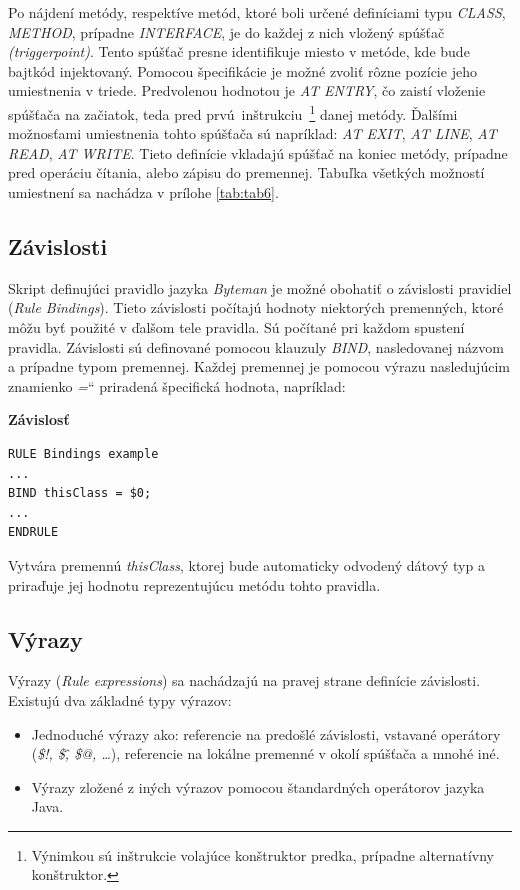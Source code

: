 \documentclass[11pt,final,oneside]{fithesis}
\newcommand\qt[1]{\quotedblbase #1\textquotedblleft}%
\newenvironment{example}[1]
{
\vspace{3mm}
\noindent\textbf{#1}
\vspace{2mm}
}
{
\vspace{3mm}
}
\begin{document}
Po nájdení metódy, respektíve metód, ktoré boli určené definíciami typu
\textit{CLASS}, \textit{METHOD}, prípadne \textit{INTERFACE}, je do každej z 
nich vložený spúšťač \textit{(triggerpoint)}. Tento spúšťač presne 
identifikuje miesto v metóde, kde bude bajtkód injektovaný. Pomocou 
špecifikácie je možné zvoliť rôzne pozície jeho umiestnenia v triede. 
Predvolenou hodnotou je \textit{AT ENTRY}, čo zaistí vloženie spúšťača na 
začiatok, teda pred prvú~inštrukciu~\footnote{Výnimkou sú inštrukcie volajúce 
konštruktor predka, prípadne alternatívny konštruktor.} danej metódy. Ďalšími 
možnosťami umiestnenia tohto spúšťača sú napríklad: \textit{AT EXIT},
\textit{AT LINE}, \textit{AT READ}, \textit{AT WRITE}. Tieto definície 
vkladajú spúšťač na koniec metódy, prípadne pred operáciu čítania, alebo 
zápisu do premennej. Tabuľka všetkých možností umiestnení sa nachádza v
prílohe \ref{tab:tab6}.

\subsection{Závislosti}
Skript definujúci  pravidlo jazyka \textit{Byteman} je možné obohatiť o 
závislosti pravidiel (\textit{Rule Bindings}). Tieto závislosti 
počítajú hodnoty niektorých premenných, ktoré môžu byť použité v ďalšom tele 
pravidla. Sú počítané pri každom spustení pravidla. Závislosti sú definované 
pomocou klauzuly \textit{BIND}, nasledovanej názvom a prípadne typom premennej.
Každej premennej je pomocou výrazu nasledujúcim znamienko \qt{\textit{=}} 
priradená špecifická hodnota, napríklad:

\begin{example}{Závislosť}
\begin{verbatim}
RULE Bindings example
...
BIND thisClass = $0;
...
ENDRULE
\end{verbatim}
\end{example}

Vytvára premennú \textit{thisClass}, ktorej bude automaticky odvodený dátový 
typ a priraďuje jej hodnotu reprezentujúcu metódu tohto pravidla.

\subsection{Výrazy}
Výrazy (\textit{Rule expressions}) sa nachádzajú na pravej strane definície 
závislosti. Existujú dva základné typy výrazov:
\begin{itemize}
\item Jednoduché výrazy ako: referencie na predošlé závislosti, 
vstavané operátory (\textit{\$!, \$\^, \$@, …}), referencie na lokálne 
premenné v okolí spúšťača a mnohé iné.
\item Výrazy zložené z iných výrazov pomocou štandardných operátorov jazyka 
Java.
\end{itemize}
\end{document}
